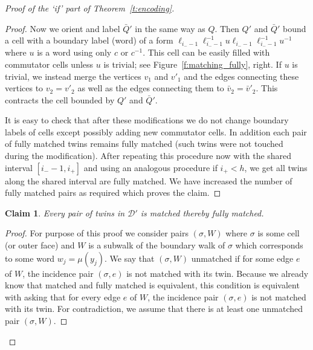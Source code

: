 \documentclass[10pt,a4paper]{article}
\newtheorem{claim}{Claim}[theorem]
\theoremstyle{definition}
\theoremstyle{remark}
\newcommand\DD{\mathcal{D}}
\newcounter{sideremark}
\newcommand{\marrow}{\stepcounter{sideremark}\marginpar{$\boldsymbol{\longleftarrow\scriptstyle\arabic{sideremark}}$}}
\newcommand{\martin}[1]{{\color{blue}\vskip 5pt\textsf{*** (Martin) \marrow #1\vskip 5pt}}}
\begin{document}
\begin{proof}[Proof of the `if' part of Theorem~\ref{t:encoding}]
\begin{proof}
Now we orient and label $\bar Q'$ in the same way as $Q$. Then $Q'$ and $\bar
Q'$ bound a cell with a boundary label (word) of a form $\ell_{i_- -
1}\ell_{i_- - 1}^{-1}u\ell_{i_- -1}\ell_{i_- - 1}^{-1}u^{-1}$ where $u$ is a
word using only $c$ or $c^{-1}$. This cell can be easily filled with commutator
cells unless $u$ is trivial; see Figure~\ref{f:matching_fully}, right. If $u$
is trivial, we instead merge the vertices $v_1$ and $v'_1$ and the edges
connecting these vertices to $v_2 = v'_2$ as well as the edges
connecting them to $\bar v_2 = \bar v'_2$. This contracts the cell bounded by
$Q'$ and $\bar Q'$.  


It is easy to check that after these modifications we do not change boundary
labels of cells except possibly adding new commutator cells. In addition each
pair of fully matched twins remains fully matched (such twins were not touched
during the modification). After repeating this procedure now with the shared
interval $[i_- - 1, i_+]$ and using an analogous procedure if $i_+ < h$, we get
all twins along the shared interval are fully matched. We have increased
the number of fully matched pairs as required which proves the claim.
\end{proof}


\begin{claim}
\label{c:fully_matched}
  Every pair of twins in $\DD'$ is matched thereby fully matched.
\end{claim}

\begin{proof}
  For purpose of this proof we consider pairs $(\sigma, W)$ where $\sigma$ is
  some cell (or outer face) and
  $W$ is a subwalk  of the boundary walk of $\sigma$ which corresponds to some
  word $w_j = \mu(y_j)$. We say that $(\sigma, W)$ unmatched if for some edge
  $e$ of $W$, the incidence pair $(\sigma, e)$ is not matched with its twin.
  Because we already know that matched and fully matched is equivalent, this
  condition is equivalent with asking that for every edge $e$ of $W$, the
  incidence pair $(\sigma, e)$ is not matched with its twin. For contradiction,
  we assume that there is at least one unmatched pair $(\sigma, W)$.


\end{proof}
\end{proof}
\end{document}
